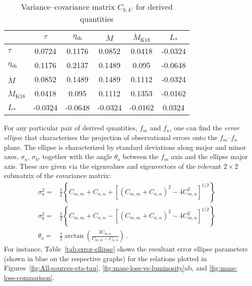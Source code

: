 \documentclass[useAMS, usenatbib, a4paper]{mnras}
\newcommand\shell{\ensuremath{_{\text{sh}}}}
\begin{document}
\begin{table}
  \centering
  \caption[Covariance]{Variance--covariance matrix \(C_{k,k'}\) for derived quantities}
  \label{tab:covariance}
  \setlength\tabcolsep{3pt}
  \begin{tabular}{l S S S S S }
    \toprule
    & {\(\tau\)} & {\(\eta\shell\)}
    & {\(\dot M\)} & {\(\dot M_{\text{K18}}\)} & {\(L_*\)}
    \\
    \midrule
    \(\tau\)               &  0.0724 &  0.1176 &  0.0852 &  0.0418 & -0.0324 \\
    \(\eta\shell\)         &  0.1176 &  0.2137 &  0.1489 &   0.095 & -0.0648 \\
    \(\dot M\)             &  0.0852 &  0.1489 &  0.1489 &  0.1112 & -0.0324 \\
    \(\dot M_{\text{K18}}\)&  0.0418 &   0.095 &  0.1112 &  0.1353 & -0.0162 \\
    \(L_*\)                & -0.0324 & -0.0648 & -0.0324 & -0.0162 &  0.0324 \\
    \bottomrule
  \end{tabular}
\end{table}

For any particular pair of derived quantities, \(f_m\) and \(f_{n}\),
one can find the \textit{error ellipse} that characterises the
projection of observational errors onto the \(f_m\)--\(f_{n}\) plane.
The ellipse is characterized by standard deviations along major and
minor axes, \(\sigma_a\), \(\sigma_b\), together with the angle
\(\theta_a\) between the \(f_m\) axis and the ellipse major axis.
These are given via the eigenvalues and eigenvectors of the relevant
\(2 \times 2\) submatrix of the covariance matrix:
\begin{align}
  \label{eq:error-ellipse}
  \sigma_a^2 = & \frac12 \left\{   C_{m,m} + C_{n,n}
                 + \left[ \left( C_{m,m} + C_{n,n} \right)^2
                 - 4 C_{m,n}^2 \right]^{1/2}\right\} \\
  \sigma_b^2 = & \frac12 \left\{   C_{m,m} + C_{n,n}
                 - \left[ \left( C_{m,m} + C_{n,n} \right)^2
                 - 4 C_{m,n}^2 \right]^{1/2}\right\} \\
  \theta_a = & \frac12 \arctan \left( \frac{2 C_{m,n}}{C_{m,m} - C_{n,n}} \right) \ .
\end{align}
For instance, Table~\ref{tab:error-ellipse} shows the resultant error
ellipse parameters (shown in blue on the respective graphs) for the
relations plotted in Figures~\ref{fig:All-sources-eta-tau},
\ref{fig:mass-loss-vs-luminosity}ab, and
\ref{fig:mass-loss-comparison}.
\end{document}
